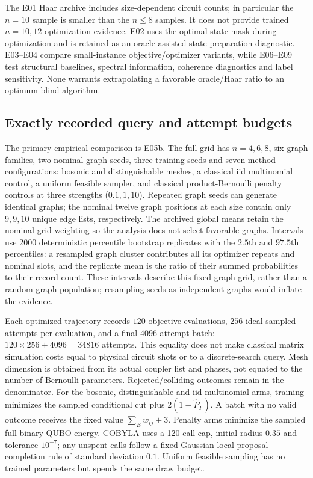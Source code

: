The E01 Haar archive includes size-dependent circuit counts; in particular the $n=10$ sample is smaller than the $n\le8$ samples. It does not provide trained $n=10,12$ optimization evidence. E02 uses the optimal-state mask during optimization and is retained as an oracle-assisted state-preparation diagnostic. E03--E04 compare small-instance objective/optimizer variants, while E06--E09 test structural baselines, spectral information, coherence diagnostics and label sensitivity. None warrants extrapolating a favorable oracle/Haar ratio to an optimum-blind algorithm.

\subsection{Exactly recorded query and attempt budgets}
The primary empirical comparison is E05b. The full grid has $n=4,6,8$, six graph families, two nominal graph seeds, three training seeds and seven method configurations: bosonic and distinguishable meshes, a classical iid multinomial control, a uniform feasible sampler, and classical product-Bernoulli penalty controls at three strengths ($0.1,1,10$). Repeated graph seeds can generate identical graphs; the nominal twelve graph positions at each size contain only $9,9,10$ unique edge lists, respectively. The archived global means retain the nominal grid weighting so the analysis does not select favorable graphs. Intervals use 2000 deterministic percentile bootstrap replicates with the $2.5$th and $97.5$th percentiles: a resampled graph cluster contributes all its optimizer repeats and nominal slots, and the replicate mean is the ratio of their summed probabilities to their record count. These intervals describe this fixed graph grid, rather than a random graph population; resampling seeds as independent graphs would inflate the evidence.

Each optimized trajectory records $120$ objective evaluations, $256$ ideal sampled attempts per evaluation, and a final $4096$-attempt batch: $120\times256+4096=34816$ attempts. This equality does not make classical matrix simulation costs equal to physical circuit shots or to a discrete-search query. Mesh dimension is obtained from its actual coupler list and phases, not equated to the number of Bernoulli parameters. Rejected/colliding outcomes remain in the denominator. For the bosonic, distinguishable and iid multinomial arms, training minimizes the sampled conditional cut plus $2(1-\widehat P_F)$. A batch with no valid outcome receives the fixed value $\sum_E w_{ij}+3$. Penalty arms minimize the sampled full binary QUBO energy. COBYLA uses a 120-call cap, initial radius $0.35$ and tolerance $10^{-7}$; any unspent calls follow a fixed Gaussian local-proposal completion rule of standard deviation $0.1$. Uniform feasible sampling has no trained parameters but spends the same draw budget.

